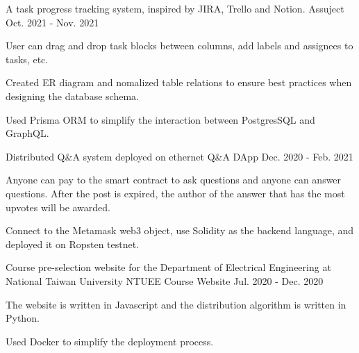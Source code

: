 \begin{cventries}
  \cventry
  {A task progress tracking system, inspired by JIRA, Trello and Notion.}
  {Assuject \href{https://github.com/MortalHappiness/DBM2021FallMidtermProject}{\color{red}{[GitHub Link]}}}
  {}
  {Oct. 2021 - Nov. 2021} %
  {
    \begin{cvitems} %
      \item {User can drag and drop task blocks between columns, add labels and assignees to tasks, etc.}
      \item {Created ER diagram and nomalized table relations to ensure best practices when designing the database schema.}
      \item {Used Prisma ORM to simplify the interaction between PostgresSQL and GraphQL.}
    \end{cvitems}
  }

  \cventry
  {Distributed Q\&A system deployed on ethernet}
  {Q\&A DApp \href{https://github.com/MortalHappiness/NMLab2020Fall-Final}{\color{red}{[GitHub Link]}}}
  {}
  {Dec. 2020 - Feb. 2021} %
  {
    \begin{cvitems} %
      \item {Anyone can pay to the smart contract to ask questions and anyone can answer questions. After the post is expired, the author of the answer that has the most upvotes will be awarded.}
      \item {Connect to the Metamask web3 object, use Solidity as the backend language, and deployed it on Ropsten testnet.}
    \end{cvitems}
  }

  \cventry
  {Course pre-selection website for the Department of Electrical Engineering at National Taiwan University}
  {NTUEE Course Website \href{https://github.com/NTUEEInfoDep/NTUEECourseWebsite2020}{\color{red}{[GitHub Link]}}}
  {}
  {Jul. 2020 - Dec. 2020} %
  {
    \begin{cvitems} %
      \item {The website is written in Javascript and the distribution algorithm is written in Python.}
      \item {Used Docker to simplify the deployment process.}
    \end{cvitems}
  }


\end{cventries}

